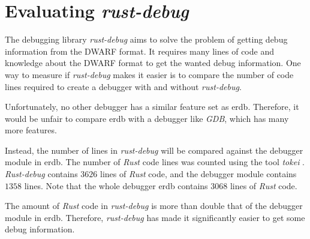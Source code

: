 
\section{Evaluating \emph{rust-debug}} \label{sec:evalrd}
The debugging library \emph{rust-debug} aims to solve the problem of getting debug information from the \gls{DWARF} format.
It requires many lines of code and knowledge about the \gls{DWARF} format to get the wanted debug information.
One way to measure if \emph{rust-debug} makes it easier is to compare the number of code lines required to create a debugger with and without \emph{rust-debug}.


Unfortunately, no other debugger has a similar feature set as \gls{erdb}.
Therefore, it would be unfair to compare \gls{erdb} with a debugger like \emph{GDB}, which has many more features.


Instead, the number of lines in \emph{rust-debug} will be compared against the debugger module in \gls{erdb}.
The number of \emph{Rust} code lines was counted using the tool \emph{tokei} \cite{tokei}.
\emph{Rust-debug} contains $3626$ lines of \emph{Rust} code, and the debugger module contains $1358$ lines.
Note that the whole debugger \gls{erdb} contains $3068$ lines of \emph{Rust} code.


The amount of \emph{Rust} code in \emph{rust-debug} is more than double that of the debugger module in \gls{erdb}.
Therefore, \emph{rust-debug} has made it significantly easier to get some debug information.



